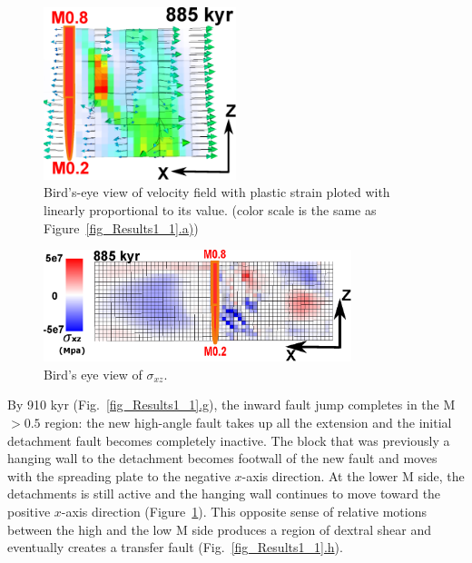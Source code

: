 \begin{figure}[h]
  \centering
    \includegraphics[width=0.5\textwidth]{./Figures/fig_Results_1_velocity_field.eps}
  \caption{Bird's-eye view of velocity field with plastic strain ploted with   linearly proportional to its value. (color scale is the same as Figure~\hyperref[fig_Results1_1]{\ref{fig_Results1_1}.a)})}
 \label{fig_Results_1_velocity_field}
\end{figure}

\begin{figure}[h]
  \centering
    \includegraphics[width=0.8\textwidth]{./Figures/fig_Results_1_Sxz.eps}
  \caption{Bird's eye view of $\sigma_{xz}$.}
 \label{fig_Results_1_Sxz}
\end{figure}

By 910 kyr (Fig.~\hyperref[fig_Results1_1]{\ref{fig_Results1_1}.g}), the inward fault jump completes in the M $> 0.5$ region: the new high-angle fault takes up all the extension and the initial detachment fault becomes completely inactive. The block that was previously a hanging wall to the detachment becomes footwall of the new fault and moves with the spreading plate to the negative $x$-axis direction. At the lower M side, the detachments is still active and the hanging wall continues to move toward the positive $x$-axis direction (Figure~\hyperref[fig_Results_1_velocity_field]{\ref{fig_Results_1_velocity_field}}). This opposite sense of relative motions between the high and the low M side produces a region of dextral shear and eventually creates a transfer fault (Fig.~\hyperref[fig_Results1_1]{\ref{fig_Results1_1}.h}). %

